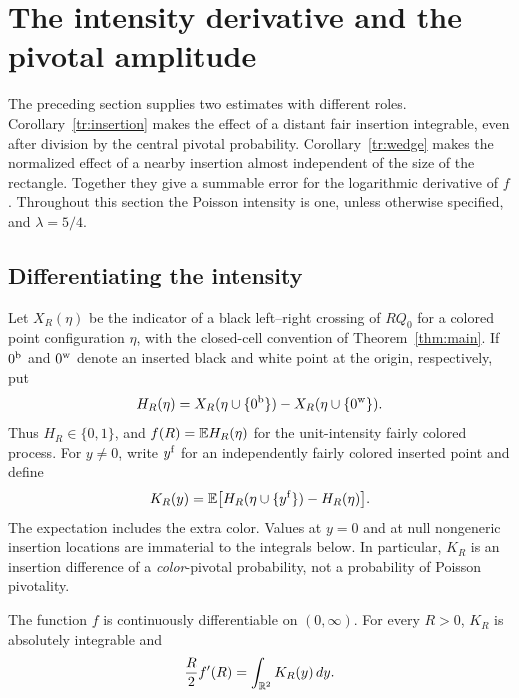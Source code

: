 \section{The intensity derivative and the pivotal amplitude}
\label{sec:amplitude}

The preceding section supplies two estimates with different roles.
Corollary~\ref{tr:insertion} makes the effect of a distant fair insertion
integrable, even after division by the central pivotal probability.
Corollary~\ref{tr:wedge} makes the normalized effect of a nearby insertion
almost independent of the size of the rectangle. Together they give a
summable error for the logarithmic derivative of $f$.
Throughout this section the Poisson intensity is one, unless otherwise
specified, and $\lambda=5/4$.

\subsection{Differentiating the intensity}

Let $X_R(\eta)$ be the indicator of a black left--right crossing of
$RQ_0$ for a colored point configuration $\eta$, with the closed-cell
convention of Theorem~\ref{thm:main}. If $0^{\rm b}$ and $0^{\rm w}$
denote an inserted black and white point at the origin, respectively, put
\[
 H_R(\eta)
 =X_R(\eta\cup\{0^{\rm b}\})-X_R(\eta\cup\{0^{\rm w}\}).
\]
Thus $H_R\in\{0,1\}$, and $f(R)=\mathbb E H_R(\eta)$ for the unit-intensity
fairly colored process. For $y\ne0$, write $y^{\rm f}$ for an independently
fairly colored inserted point and define
\begin{equation}\label{cl:kernel}
 K_R(y)=\mathbb E\bigl[H_R(\eta\cup\{y^{\rm f}\})-H_R(\eta)\bigr].
\end{equation}
The expectation includes the extra color. Values at $y=0$ and at null
nongeneric insertion locations are immaterial to the integrals below.
In particular, $K_R$ is an insertion difference of a \emph{color}-pivotal
probability, not a probability of Poisson pivotality.

\begin{lemma}\label{cl:derivative}
The function $f$ is continuously differentiable on $(0,\infty)$. For
every $R>0$, $K_R$ is absolutely integrable and
\begin{equation}\label{cl:derivative-eq}
 \frac R2 f'(R)=\int_{\mathbb R^2}K_R(y)\,dy.
\end{equation}
\end{lemma}

